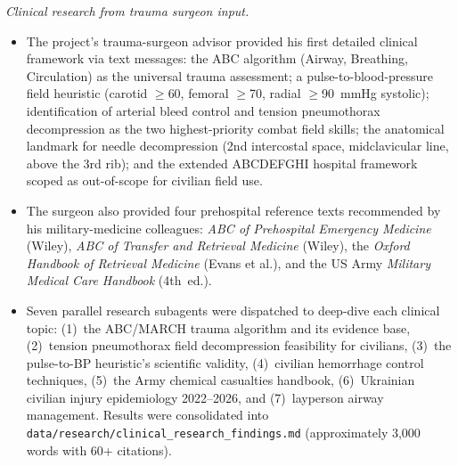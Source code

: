 \documentclass{article}
\theoremstyle{plain}
\theoremstyle{definition}
\theoremstyle{remark}
\begin{document}
\textit{Clinical research from trauma surgeon input.}
\begin{itemize}
\item The project's trauma-surgeon advisor provided his first detailed clinical framework via text messages: the ABC algorithm (Airway, Breathing, Circulation) as the universal trauma assessment; a pulse-to-blood-pressure field heuristic (carotid $\geq$60, femoral $\geq$70, radial $\geq$90~mmHg systolic); identification of arterial bleed control and tension pneumothorax decompression as the two highest-priority combat field skills; the anatomical landmark for needle decompression (2nd intercostal space, midclavicular line, above the 3rd rib); and the extended ABCDEFGHI hospital framework scoped as out-of-scope for civilian field use.
\item The surgeon also provided four prehospital reference texts recommended by his military-medicine colleagues: \emph{ABC of Prehospital Emergency Medicine} (Wiley), \emph{ABC of Transfer and Retrieval Medicine} (Wiley), the \emph{Oxford Handbook of Retrieval Medicine} (Evans et al.), and the US Army \emph{Military Medical Care Handbook} (4th~ed.).
\item Seven parallel research subagents were dispatched to deep-dive each clinical topic: (1)~the ABC/MARCH trauma algorithm and its evidence base, (2)~tension pneumothorax field decompression feasibility for civilians, (3)~the pulse-to-BP heuristic's scientific validity, (4)~civilian hemorrhage control techniques, (5)~the Army chemical casualties handbook, (6)~Ukrainian civilian injury epidemiology 2022--2026, and (7)~layperson airway management. Results were consolidated into \texttt{data/research/clinical\_research\_findings.md} (approximately 3{,}000 words with 60+ citations).
\end{itemize}
\end{document}
